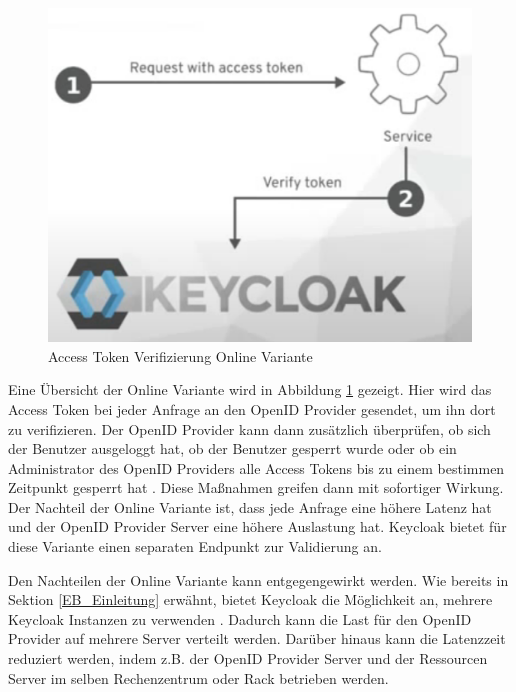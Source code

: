 \begin{figure}[!ht]
	\centering
	\includegraphics[width=.6\textwidth]{Images/Ebert/VerifyAccessTokenOnline.PNG}
	\caption{Access Token Verifizierung Online Variante \cite{EB32}}
	\label{fig:EB_Access Token Verifizierung Online Variante}
\end{figure}

Eine Übersicht der Online Variante wird in Abbildung \ref{fig:EB_Access Token Verifizierung Online Variante} gezeigt. Hier wird das Access Token bei jeder Anfrage an den OpenID Provider gesendet, um ihn dort zu verifizieren. Der OpenID Provider kann dann zusätzlich überprüfen, ob sich der Benutzer ausgeloggt hat, ob der Benutzer gesperrt wurde oder ob ein Administrator des OpenID Providers alle Access Tokens bis zu einem bestimmen Zeitpunkt gesperrt hat \cite{EB32}. Diese Maßnahmen greifen dann mit sofortiger Wirkung. Der Nachteil der Online Variante ist, dass jede Anfrage eine höhere Latenz hat und der OpenID Provider Server eine höhere Auslastung hat. Keycloak bietet für diese Variante einen separaten Endpunkt zur Validierung an. 

Den Nachteilen der Online Variante kann entgegengewirkt werden. Wie bereits in Sektion \ref{EB_Einleitung} erwähnt, bietet Keycloak die Möglichkeit an, mehrere Keycloak Instanzen zu verwenden \cite{EB33}. Dadurch kann die Last für den OpenID Provider auf mehrere Server verteilt werden. Darüber hinaus kann die Latenzzeit reduziert werden, indem z.B. der OpenID Provider Server und der Ressourcen Server im selben Rechenzentrum oder Rack betrieben werden.




